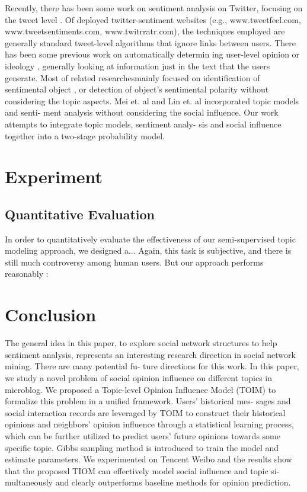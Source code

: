 \documentclass[runningheads,a4paper]{llncs}
\begin{document}
{Recently, there has been some work on sentiment analysis
on Twitter, focusing on the tweet level \cite{barbosa2010robust,davidov2010enhanced,jiang2011target,li2010micro,tan2011user}. Of deployed twitter-sentiment websites (e.g., www.tweetfeel.com, www.tweetsentiments.com, www.twitrratr.com), the techniques employed are generally standard tweet-level algorithms that ignore links between users. There has been some previous work on automatically determin
ing user-level opinion or ideology \cite{agrawal2003mining,mostafa2013more,malouf2008taking,yu2008classifying}, generally looking at information just in the text that the users generate. 
Most of related researchesmainly focused on identification of sentimental object \cite{liu2010comment}, or detection of object’s sentimental polarity \cite{zhai2011constrained} without considering the topic aspects. Mei et. al \cite{mei2007topic} and Lin et. al \cite{lin2009joint} incorporated topic models and senti- ment analysis without considering the social influence. Our work attempts to integrate topic models, sentiment analy- sis and social influence together into a two-stage probability model.


\section{Experiment}

\subsection{Quantitative Evaluation}
In order to quantitatively evaluate the effectiveness of our semi-supervised topic modeling approach, we designed a...
Again, this task is subjective, and there is still much controversy among human users. But our approach performs reasonably :
\section{Conclusion}
The general idea in this paper, to explore social network structures to help sentiment analysis, represents an interesting research direction in social network mining. There are many potential fu- ture directions for this work.
In this paper, we study a novel problem of social opinion
influence on different topics in microblog. We proposed a Topic-level Opinion Influence Model (TOIM) to formalize this problem in a unified framework. Users’ historical mes- sages and social interaction records are leveraged by TOIM to construct their historical opinions and neighbors’ opinion influence through a statistical learning process, which can be further utilized to predict users’ future opinions towards some specific topic. Gibbs sampling method is introduced to train the model and estimate parameters. We experimented on Tencent Weibo and the results show that the proposed TIOM can effectively model social influence and topic si- multaneously and clearly outperforms baseline methods for opinion prediction.

}
\end{document}
